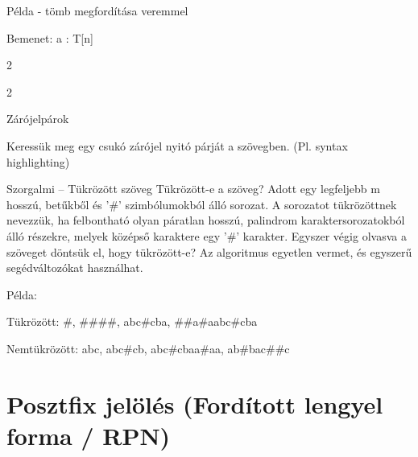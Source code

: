 \documentclass[hungarian]{beamer}
\begin{document}
\begin{frame}{Példa - tömb megfordítása veremmel}

Bemenet: a : T[n]

\setlength{\stukiwidth}{4cm}
\newcommand{\oneton}{1\,\textrm{to}\,n}
\begin{stukibox}
\begin{WHILE}{2}{\stm{i = \oneton}}
\end{WHILE}
\begin{WHILE}{2}{\stm{i = \oneton}}
\end{WHILE}
\end{stukibox}

\end{frame}

\begin{frame}[t]{Zárójelpárok}

Keressük meg egy csukó zárójel nyitó párját a szövegben. (Pl. syntax highlighting)



\end{frame}

\begin{frame}{Szorgalmi -- Tükrözött szöveg}
Tükrözött-e a szöveg? Adott egy legfeljebb m hosszú,
betűkből és ’\#’ szimbólumokból álló sorozat. A sorozatot
tükrözöttnek nevezzük, ha felbontható olyan páratlan
hosszú, palindrom karaktersorozatokból álló részekre,
melyek középső karaktere egy ’\#’ karakter. Egyszer végig
olvasva a szöveget döntsük el, hogy tükrözött-e? Az
algoritmus egyetlen vermet, és egyszerű segédváltozókat
használhat.

Példa:

Tükrözött: \#, \#\#\#\#, abc\#cba, \#\#a\#aabc\#cba

Nemtükrözött: abc, abc\#cb, abc\#cbaa\#aa, ab\#bac\#\#c

\end{frame}

\section{Posztfix jelölés (Fordított lengyel forma / RPN)}
\end{document}
